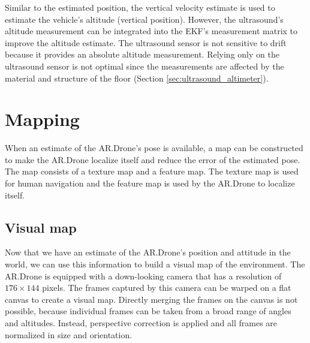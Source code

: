 Similar to the estimated position, the vertical velocity estimate is used to estimate the vehicle's altitude (vertical position).
However, the ultrasound's altitude measurement can be integrated into the EKF's measurement matrix to improve the altitude estimate.
The ultrasound sensor is not sensitive to drift because it provides an absolute altitude measurement.
Relying only on the ultrasound sensor is not optimal since the measurements are affected by the material and structure of the floor (Section \ref{sec:ultrasound_altimeter}).



	\section{Mapping}
	\label{sec:mapping}
When an estimate of the AR.Drone's pose is available, a map can be constructed to make the AR.Drone localize itself and reduce the error of the estimated pose.
The map consists of a texture map and a feature map.
The texture map is used for human navigation and the feature map is used by the AR.Drone to localize itself.

	\subsection{Visual map}
\label{sec:texture_map}
Now that we have an estimate of the AR.Drone's position and attitude in the world, we can use this information to build a visual map of the environment.
The AR.Drone is equipped with a down-looking camera that has a resolution of $176 \times 144$ pixels.
The frames captured by this camera can be warped on a flat canvas to create a visual map.
Directly merging the frames on the canvas is not possible, because individual frames can be taken from a broad range of angles and altitudes.
Instead, perspective correction is applied and all frames are normalized in size and orientation.

